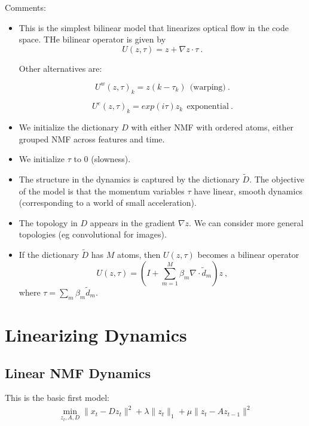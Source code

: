 \documentclass[11pt]{article} %
\begin{document}
Comments:
\begin{itemize}

\item This is the simplest bilinear model that linearizes optical flow in the code space. THe bilinear operator is given by 
$$U(z, \tau) = z + \nabla z \cdot \tau~.$$

Other alternatives are:

$$U^{w}(z, \tau)_k = z(k - \tau_k)~~\mbox{(warping)}~.$$

$$U^{e}(z, \tau)_k = exp(i \tau) z_k ~~\mbox{exponential}~.$$

\item We initialize the dictionary $D$ with either NMF with ordered atoms, either grouped NMF across features and time. 

\item We initialize $\tau$ to $0$ (slowness). 

\item The structure in the dynamics is captured by the dictionary $\widetilde{D}$. The objective of the model is that 
the momentum variables $\tau$ have linear, smooth dynamics (corresponding to a world of small acceleration).

\item The topology in $D$ appears in the gradient $\nabla z$. We can consider more general topologies (eg convolutional for images).

\item If the dictionary $\widetilde{D}$ has $M$ atoms, then $U(z,\tau)$ becomes a bilinear operator 
$$U(z,\tau) = (I + \sum_{m=1}^M \beta_m \nabla \cdot  \widetilde{d}_m ) z~,$$
where $\tau = \sum_m \beta_m \widetilde{d}_m$.

\end{itemize}


\section{Linearizing Dynamics}

\subsection{Linear NMF Dynamics}

This is the basic first model:
\begin{eqnarray}
\min_{z_t, A, D} \| x_t - D z_t \|^2 + \lambda \|z_t \|_1 + \mu \|z_t - A z_{t-1} \|^2
\end{eqnarray}
\end{document}
